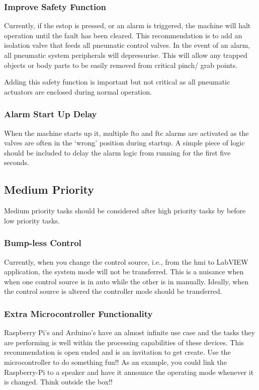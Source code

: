        \subsubsection{Improve Safety Function} 
            Currently, if the \acrshort{estop} is pressed, or an alarm is triggered, the machine will halt operation until the fault has been cleared. This recommendation is to add an isolation valve that feeds all pneumatic control valves. In the event of an alarm, all pneumatic system peripherals will depressurise. This will allow any trapped objects or body parts to be easily removed from critical pinch/ grab points. 
			
			Adding this safety function is important but not critical as all pneumatic actuators are enclosed during normal operation.
			
		\subsubsection{Alarm Start Up Delay}
			When the machine starts up it, multiple \acrshort{fto} and \acrshort{ftc} alarms are activated as the valves are often in the `wrong' position during startup. A simple piece of logic should be included to delay the alarm logic from running for the first five seconds. 
            

    \subsection{Medium Priority}
    
		Medium priority tasks should be considered after high priority tasks by before low priority tasks. 
        \subsubsection{Bump-less Control} 
            Currently, when you change the control source, i.e., from the \acrshort{hmi} to LabVIEW application, the system mode will not be transferred. This is a nuisance when when one control source is in auto while the other is in manually. Ideally, when the control source is altered the controller mode should be transferred. 
            
        \subsubsection{Extra Microcontroller Functionality} 
            Raspberry Pi's and Arduino's have an almost infinite use case and the tasks they are performing is well within the processing capabilities of these devices. This recommendation is open ended and is an invitation to get create.  Use the microcontroller to do something fun!! As an example, you could link the Raspberry-Pi to a speaker and have it announce the operating mode whenever it is changed. Think outside the box!!
        
